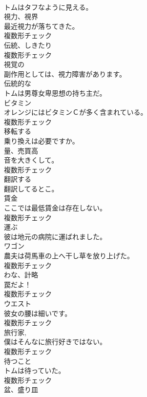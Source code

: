 \documentclass[8pt]{extreport}
\begin{document}
\begin{CJK}{UTF8}{min}
\\	トムはタフなように見える。	
\\	[名詞]	視力、視界	
\\	最近視力が落ちてきた。	
\\	複数形チェック
\\	[名詞]	伝統、しきたり	
\\	複数形チェック
\\	[形容詞]	視覚の	
\\	副作用としては、視力障害があります。	
\\	[形容詞]	伝統的な	
\\	トムは男尊女卑思想の持ち主だ。	
\\	[名詞]	ビタミン	
\\	オレンジにはビタミンＣが多く含まれている。	
\\	複数形チェック
\\	[動詞]	移転する	
\\	乗り換えは必要ですか。	
\\	[名詞]	量、売買高	
\\	音を大きくして。	
\\	複数形チェック
\\	[動詞]	翻訳する	
\\	翻訳してるとこ。	
\\	[名詞]	賃金	
\\	ここでは最低賃金は存在しない。	
\\	複数形チェック
\\	[動詞]	運ぶ	
\\	彼は地元の病院に運ばれました。	
\\	[名詞]	ワゴン	
\\	農夫は荷馬車の上へ干し草を放り上げた。	
\\	複数形チェック
\\	[名詞]	わな、計略	
\\	罠だよ！	
\\	複数形チェック
\\	[名詞]	ウエスト	
\\	彼女の腰は細いです。	
\\	複数形チェック
\\	[名詞]	旅行家,	
\\	僕はそんなに旅行好きではない。	
\\	複数形チェック
\\	[名詞]	待つこと	
\\	トムは待っていた。	
\\	複数形チェック
\\	[名詞]	盆、盛り皿	

\end{CJK}
\end{document}
